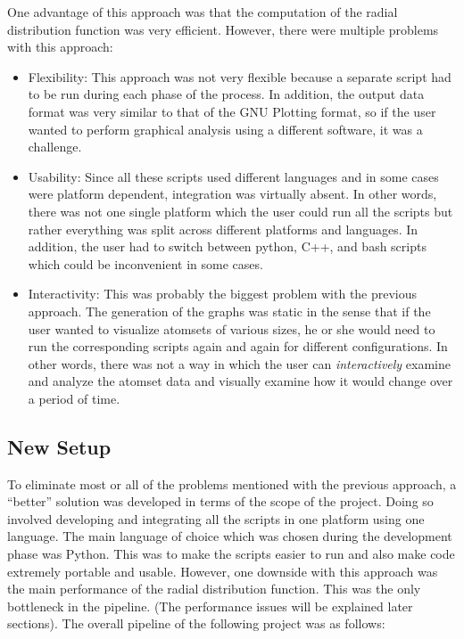 One advantage of this approach was that the computation of the radial distribution function was very efficient. However, there were multiple problems with this approach:

\begin{itemize}
    \item Flexibility: This approach was not very flexible because a separate script had to be run during each phase of the process. In addition, the output data format was very similar to that of the GNU Plotting format, so if the user wanted to perform graphical analysis using a different software, it was a challenge.
    
    \item Usability: Since all these scripts used different languages and in some cases were platform dependent, integration was virtually absent. In other words, there was not one single platform which the user could run all the scripts but rather everything was split across different platforms and languages. In addition, the user had to switch between python, C++, and bash scripts which could be inconvenient in some cases. 
    
    \item Interactivity: This was probably the biggest problem with the previous approach. The generation of the graphs was static in the sense that if the user wanted to visualize atomsets of various sizes, he or she would need to run the corresponding scripts again and again for different configurations. In other words, there was not a way in which the user can \textit{interactively} examine and analyze the atomset data and visually examine how it would change over a period of time.
\end{itemize}

\subsection*{New Setup}

To eliminate most or all of the problems mentioned with the previous approach, a ``better'' solution was developed in terms of the scope of the project. Doing so involved developing and integrating all the scripts in one platform using one language. The main language of choice which was chosen during the development phase was Python. This was to make the scripts easier to run and also make code extremely portable and usable. However, one downside with this approach was the main performance of the radial distribution function. This was the only bottleneck in the pipeline. (The performance issues will be explained later sections). The overall pipeline of the following project was as follows:



